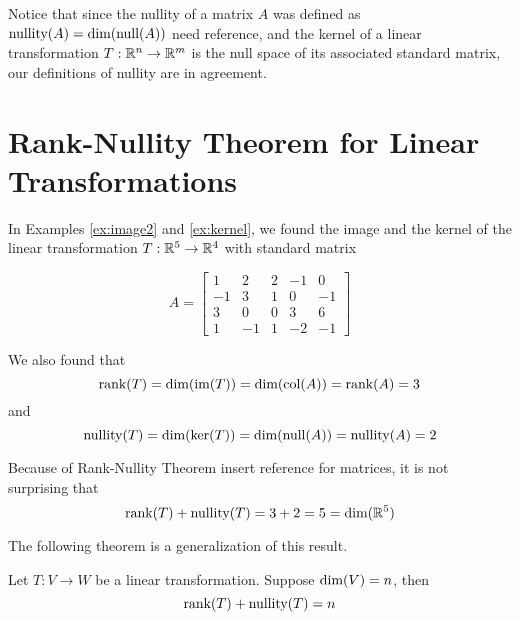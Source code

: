 \documentclass{ximera}
\begin{document}
Notice that since the nullity of a matrix $A$ was defined as $\textnormal{nullity}(A) = \textnormal{dim}(\textnormal{null}(A))$ {\color{red} need reference}, and the kernel of a linear transformation $T:\mathbb{R}^n\rightarrow \mathbb{R}^m$ is the null space of its associated standard matrix, our definitions of nullity are in agreement.

\section*{Rank-Nullity Theorem for Linear Transformations}

In Examples \ref{ex:image2} and \ref{ex:kernel}, we found the image and the kernel of the linear transformation $T:\mathbb{R}^5\rightarrow \mathbb{R}^4$ with standard matrix

$$A=\begin{bmatrix}1 & 2 & 2 &-1 & 0\\-1 & 3 & 1 & 0 & -1\\3 & 0 & 0 & 3 & 6\\ 1 & -1 & 1 & -2 & -1\end{bmatrix}$$

We also found that
$$\textnormal{rank}(T)=\textnormal{dim}(\textnormal{im}(T))=\textnormal{dim}(\textnormal{col}(A))=\textnormal{rank}(A)=3$$
and
$$\textnormal{nullity}(T)=\textnormal{dim}(\textnormal{ker}(T))=\textnormal{dim}(\textnormal{null}(A))=\textnormal{nullity}(A)=2$$

Because of Rank-Nullity Theorem {\color{red} insert reference} for matrices, it is not surprising that 
$$\textnormal{rank}(T)+\textnormal{nullity}(T)=3+2=5=\textnormal{dim}(\mathbb{R}^5)$$


The following theorem is a generalization of this result.

\begin{theorem}
Let $T:V\rightarrow W$ be a linear transformation.  Suppose $\textnormal{dim}(V)=n$, then
$$\textnormal{rank}(T)+\textnormal{nullity}(T)=n$$
\end{theorem}
\end{document}
